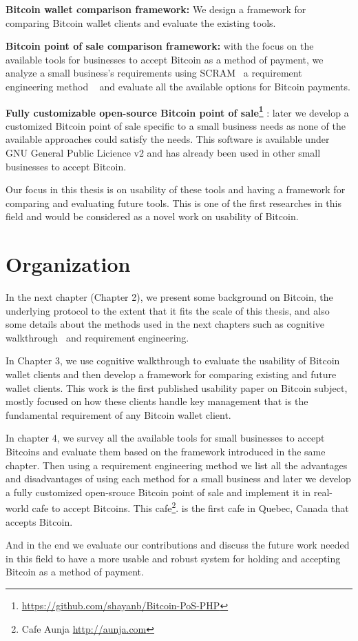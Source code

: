 \textbf{Bitcoin wallet comparison framework:} We design a framework for comparing Bitcoin wallet clients and evaluate the existing tools.

\textbf{Bitcoin point of sale comparison framework: } with the focus on the available tools for businesses to accept Bitcoin as a method of payment, we analyze a small business's requirements using SCRAM~\cite{REScenario} a requirement engineering method ~\cite{dorfman1990system} and evaluate all the available options for Bitcoin payments.

\textbf{Fully customizable open-source Bitcoin point of sale\footnote{\url{https://github.com/shayanb/Bitcoin-PoS-PHP}} }: later we develop a customized Bitcoin point of sale specific to a small business needs as none of the available approaches could satisfy the needs. This software is available under GNU General Public Licience v2 and has already been used in other small businesses to accept Bitcoin.

Our focus in this thesis is on usability of these tools and having a framework for comparing and evaluating future tools. This is one of the first researches in this field and would be considered as a novel work on usability of Bitcoin.

\section{Organization}
In the next chapter (Chapter 2), we present some background on Bitcoin, the underlying protocol to the extent that it fits the scale of this thesis, and also some details about the methods used in the next chapters such as cognitive walkthrough~\cite{WRLP94}  and requirement engineering.

In Chapter 3, we use cognitive walkthrough to evaluate the usability of Bitcoin wallet clients and then develop a framework for comparing existing and future wallet clients. This work is the first published usability paper on Bitcoin subject, mostly focused on how these clients handle key management that is the fundamental requirement of any Bitcoin wallet client.

In chapter 4, we survey all the available tools for small businesses to accept Bitcoins and evaluate them based on the framework introduced in the same chapter. Then using a requirement engineering method we list all the advantages and disadvantages of using each method for a small business and later we develop a fully customized open-srouce Bitcoin point of sale and implement it in real-world cafe to accept Bitcoins. This cafe\footnote{ Cafe Aunja \url{http://aunja.com}}. is the first cafe in Quebec, Canada that accepts Bitcoin.

And in the end we evaluate our contributions and discuss the future work needed in this field to have a more usable and robust system for holding and accepting Bitcoin as a method of payment.